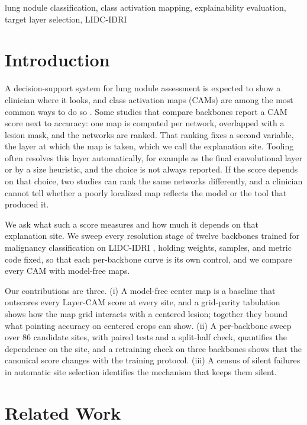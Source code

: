 \documentclass[conference]{IEEEtran}
\begin{document}
\begin{IEEEkeywords}
lung nodule classification, class activation mapping, explainability evaluation, target layer selection, LIDC-IDRI
\end{IEEEkeywords}

\section{Introduction}\label{sec:intro}

A decision-support system for lung nodule assessment is expected to show a clinician where it looks, and class activation maps (CAMs) are among the most common ways to do so \cite{bhati_xai_2024}. Some studies that compare backbones report a CAM score next to accuracy: one map is computed per network, overlapped with a lesion mask, and the networks are ranked. That ranking fixes a second variable, the layer at which the map is taken, which we call the explanation site. Tooling often resolves this layer automatically, for example as the final convolutional layer or by a size heuristic, and the choice is not always reported. If the score depends on that choice, two studies can rank the same networks differently, and a clinician cannot tell whether a poorly localized map reflects the model or the tool that produced it.

We ask what such a score measures and how much it depends on that explanation site. We sweep every resolution stage of twelve backbones trained for malignancy classification on LIDC-IDRI \cite{armato_lidcidri_2011}, holding weights, samples, and metric code fixed, so that each per-backbone curve is its own control, and we compare every CAM with model-free maps.

Our contributions are three. (i) A model-free center map is a baseline that outscores every Layer-CAM score at every site, and a grid-parity tabulation shows how the map grid interacts with a centered lesion; together they bound what pointing accuracy on centered crops can show. (ii) A per-backbone sweep over 86 candidate sites, with paired tests and a split-half check, quantifies the dependence on the site, and a retraining check on three backbones shows that the canonical score changes with the training protocol. (iii) A census of silent failures in automatic site selection identifies the mechanism that keeps them silent.

\section{Related Work}\label{sec:related}
\end{document}
